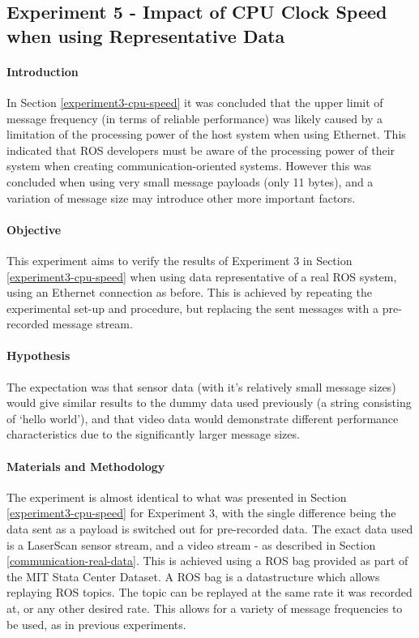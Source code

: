 \documentclass[../dissertation.tex]{subfiles}
\begin{document}
\subsection{Experiment 5 - Impact of CPU Clock Speed when using Representative Data}
\label{exp-5}

\paragraph{Introduction} In Section \ref{experiment3-cpu-speed} it was concluded that the upper limit of message frequency (in terms of reliable performance) was likely caused by a limitation of the processing power of the host system when using Ethernet. This indicated that ROS developers must be aware of the processing power of their system when creating communication-oriented systems. However this was concluded when using very small message payloads (only 11 bytes), and a variation of message size may introduce other more important factors.

\paragraph{Objective} This experiment aims to verify the results of Experiment 3 in Section \ref{experiment3-cpu-speed} when using data representative of a real ROS system, using an Ethernet connection as before. This is achieved by repeating the experimental set-up and procedure, but replacing the sent messages with a pre-recorded message stream.

\paragraph{Hypothesis} The expectation was that sensor data (with it's relatively small message sizes) would give similar results to the dummy data used previously (a string consisting of `hello world'), and that video data would demonstrate different performance characteristics due to the significantly larger message sizes.

\paragraph{Materials and Methodology} The experiment is almost identical to what was presented in Section \ref{experiment3-cpu-speed} for Experiment 3, with the single difference being the data sent as a payload is switched out for pre-recorded data. The exact data used is a LaserScan sensor stream, and a video stream - as described in Section \ref{communication-real-data}. This is achieved using a ROS bag provided as part of the MIT Stata Center Dataset. A ROS bag is a datastructure which allows replaying ROS topics. The topic can be replayed at the same rate it was recorded at, or any other desired rate. This allows for a variety of message frequencies to be used, as in previous experiments.
\end{document}
